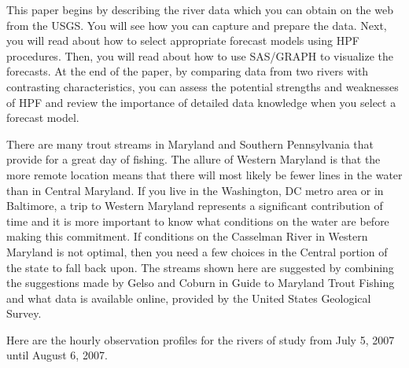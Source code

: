\documentclass[10pt]{sugconf-ish}
\begin{document}
This paper begins by describing the river data which you can obtain on the web from the USGS. You will see how you can capture and prepare the data. Next, you will read about how to select appropriate forecast models using HPF procedures. Then, you will read about how to use SAS/GRAPH to visualize the forecasts. At the end of the paper, by comparing data from two rivers with contrasting characteristics, you can assess the potential strengths and weaknesses of HPF and review the importance of detailed data knowledge when you select a forecast model.

There are many trout streams in Maryland and Southern Pennsylvania that provide for a great day of fishing.  The allure of Western Maryland is that the more remote location means that there will most likely be fewer lines in the water than in Central Maryland.  If you live in the Washington, DC metro area or in Baltimore, a trip to Western Maryland represents a significant contribution of time and it is more important to know what conditions on the water are before making this commitment.  If conditions on the Casselman River in Western Maryland is not optimal, then you need a few choices in the Central portion of the state to fall back upon. 
The streams shown here are suggested by combining the suggestions made by Gelso and Coburn in Guide to Maryland Trout Fishing and what data is available online, provided by the United States Geological Survey. 

\newpage
Here are the hourly observation profiles for the rivers of study from July 5, 2007 until August 6, 2007.\\
\end{document}
